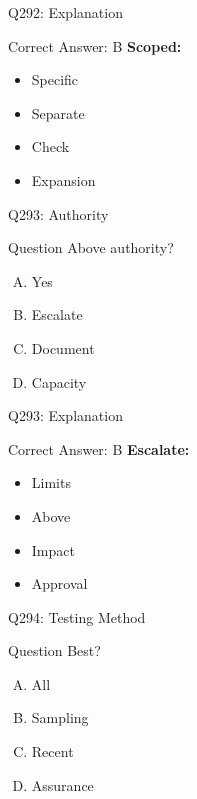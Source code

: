 \documentclass{beamer}
\begin{document}
	\begin{frame}{Q292: Explanation}
		\begin{block}{Correct Answer: B}
			\textbf{Scoped:}
			\begin{itemize}
				\item Specific
				\item Separate
				\item Check
				\item Expansion
			\end{itemize}
		\end{block}
	\end{frame}
	
	\begin{frame}{Q293: Authority}
		\begin{block}{Question}
			Above authority?
		\end{block}
		\begin{enumerate}[(A)]
			\item Yes
			\item Escalate
			\item Document
			\item Capacity
		\end{enumerate}
	\end{frame}
	
	\begin{frame}{Q293: Explanation}
		\begin{block}{Correct Answer: B}
			\textbf{Escalate:}
			\begin{itemize}
				\item Limits
				\item Above
				\item Impact
				\item Approval
			\end{itemize}
		\end{block}
	\end{frame}
	
	\begin{frame}{Q294: Testing Method}
		\begin{block}{Question}
			Best?
		\end{block}
		\begin{enumerate}[(A)]
			\item All
			\item Sampling
			\item Recent
			\item Assurance
		\end{enumerate}
	\end{frame}
	
\end{document}
